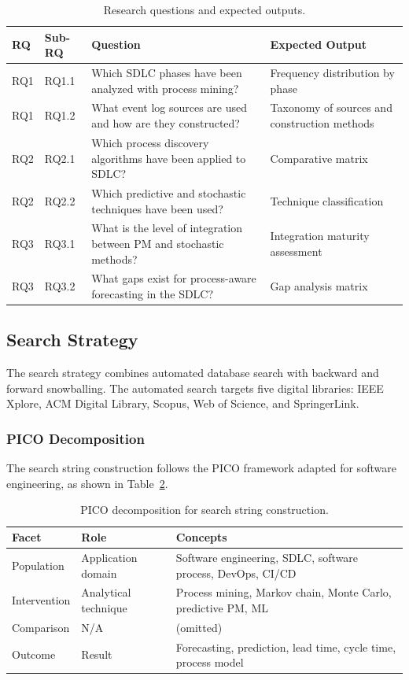 \begin{table}[htbp]
\centering
\caption{Research questions and expected outputs.}
\label{tab:slr-rqs}
\begin{tabular}{llp{7cm}p{4cm}}
\toprule
\textbf{RQ} & \textbf{Sub-RQ} & \textbf{Question} & \textbf{Expected Output} \\
\midrule
RQ1 & RQ1.1 & Which SDLC phases have been analyzed with process mining? & Frequency distribution by phase \\
RQ1 & RQ1.2 & What event log sources are used and how are they constructed? & Taxonomy of sources and construction methods \\
\midrule
RQ2 & RQ2.1 & Which process discovery algorithms have been applied to SDLC? & Comparative matrix \\
RQ2 & RQ2.2 & Which predictive and stochastic techniques have been used? & Technique classification \\
\midrule
RQ3 & RQ3.1 & What is the level of integration between PM and stochastic methods? & Integration maturity assessment \\
RQ3 & RQ3.2 & What gaps exist for process-aware forecasting in the SDLC? & Gap analysis matrix \\
\bottomrule
\end{tabular}
\end{table}


\subsection{Search Strategy}
\label{sec:slr-search}

The search strategy combines automated database search with backward and forward snowballing. The automated search targets five digital libraries: IEEE Xplore, ACM Digital Library, Scopus, Web of Science, and SpringerLink.

\subsubsection{PICO Decomposition}

The search string construction follows the PICO framework adapted for software engineering, as shown in Table~\ref{tab:pico}.

\begin{table}[htbp]
\centering
\caption{PICO decomposition for search string construction.}
\label{tab:pico}
\begin{tabular}{lp{4cm}p{7cm}}
\toprule
\textbf{Facet} & \textbf{Role} & \textbf{Concepts} \\
\midrule
Population & Application domain & Software engineering, SDLC, software process, DevOps, CI/CD \\
Intervention & Analytical technique & Process mining, Markov chain, Monte Carlo, predictive PM, ML \\
Comparison & N/A & (omitted) \\
Outcome & Result & Forecasting, prediction, lead time, cycle time, process model \\
\bottomrule
\end{tabular}
\end{table}

